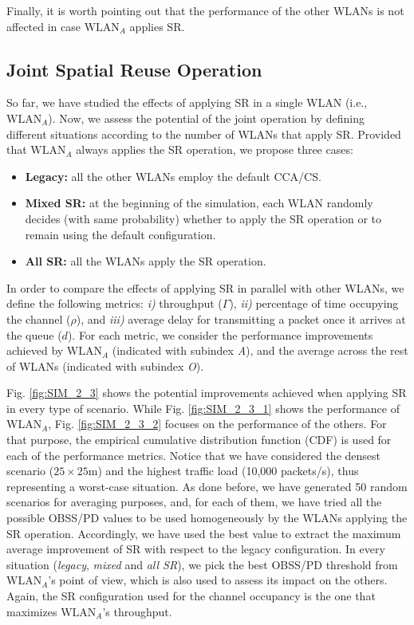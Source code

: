 \documentclass[comsoc]{IEEEtran}
\begin{document}
	Finally, it is worth pointing out that the performance of the other WLANs is not affected in case $\text{WLAN}_A$ applies SR.
	
	\subsection{Joint Spatial Reuse Operation}
	\label{section:random_scenarios_collaborative}
	So far, we have studied the effects of applying SR in a single WLAN (i.e., $\text{WLAN}_A$). Now, we assess the potential of the joint operation by defining different situations according to the number of WLANs that apply SR. Provided that $\text{WLAN}_A$ always applies the SR operation, we propose three cases: 
	\begin{itemize}
		\item \textbf{Legacy:} all the other WLANs employ the default CCA/CS.
		\item \textbf{Mixed SR:} at the beginning of the simulation, each WLAN randomly decides (with same probability) whether to apply the SR operation or to remain using the default configuration.
		\item \textbf{All SR:} all the WLANs apply the SR operation. 
	\end{itemize}
	
	In order to compare the effects of applying SR in parallel with other WLANs, we define the following metrics: \emph{i)} throughput ($\Gamma$), \emph{ii)} percentage of time occupying the channel ($\rho$), and \emph{iii)} average delay for transmitting a packet once it arrives at the queue ($d$). For each metric, we consider the performance improvements achieved by $\text{WLAN}_A$ (indicated with subindex \emph{A}), and the average across the rest of WLANs (indicated with subindex \emph{O}).

	Fig. \ref{fig:SIM_2_3} shows the potential improvements achieved when applying SR in every type of scenario. While Fig. \ref{fig:SIM_2_3_1} shows the performance of WLAN$_A$, Fig. \ref{fig:SIM_2_3_2} focuses on the performance of the others. For that purpose, the empirical cumulative distribution function (CDF) is used for each of the performance metrics. Notice that we have considered the densest scenario ($25\times25$m) and the highest traffic load (10,000 packets/s), thus representing a worst-case situation. As done before, we have generated 50 random scenarios for averaging purposes, and, for each of them, we have tried all the possible OBSS/PD values to be used homogeneously by the WLANs applying the SR operation. Accordingly, we have used the best value to extract the maximum average improvement of SR with respect to the legacy configuration. In every situation (\emph{legacy}, \emph{mixed} and \emph{all SR}), we pick the best OBSS/PD threshold from $\text{WLAN}_A$'s point of view, which is also used to assess its impact on the others. Again, the SR configuration used for the channel occupancy is the one that maximizes $\text{WLAN}_A$'s throughput.
	
\end{document}
